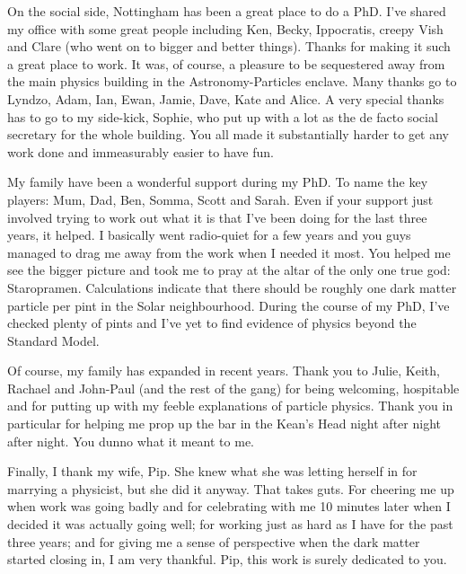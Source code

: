 On the social side, Nottingham has been a great place to do a PhD. I've shared my office with some great people including Ken, Becky, Ippocratis, creepy Vish and Clare (who went on to bigger and better things). Thanks for making it such a great place to work. It was, of course, a pleasure to be sequestered away from the main physics building in the Astronomy-Particles enclave. Many thanks go to Lyndzo, Adam, Ian, Ewan, Jamie, Dave, Kate and Alice. A very special thanks has to go to my side-kick, Sophie, who put up with a lot as the de facto social secretary for the whole building. You all made it substantially harder to get any work done and immeasurably easier to have fun.

My family have been a wonderful support during my PhD. To name the key players: Mum, Dad, Ben, Somma, Scott and Sarah. Even if your support just involved trying to work out what it is that I've been doing for the last three years, it helped. I basically went radio-quiet for a few years and you guys managed to drag me away from the work when I needed it most. You helped me see the bigger picture and took me to pray at the altar of the only one true god: Staropramen. Calculations indicate that there should be roughly one dark matter particle per pint in the Solar neighbourhood. During the course of my PhD, I've checked plenty of pints and I've yet to find evidence of physics beyond the Standard Model.

Of course, my family has expanded in recent years. Thank you to Julie, Keith, Rachael and John-Paul (and the rest of the gang) for being welcoming, hospitable and for putting up with my feeble explanations of particle physics. Thank you in particular for helping me prop up the bar in the Kean's Head night after night after night. You dunno what it meant to me.

Finally, I thank my wife, Pip. She knew what she was letting herself in for marrying a physicist, but she did it anyway. That takes guts. For cheering me up when work was going badly and for celebrating with me 10 minutes later when I decided it was actually going well; for working just as hard as I have for the past three years; and for giving me a sense of perspective when the dark matter started closing in, I am very thankful. Pip, this work is surely dedicated to you.




